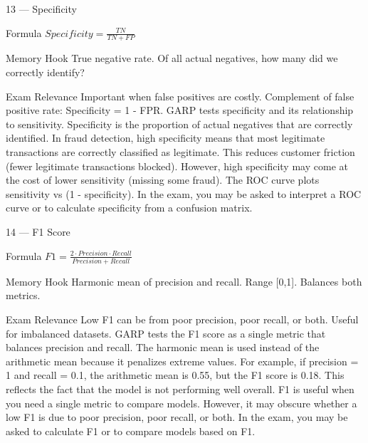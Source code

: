 \documentclass[aspectratio=169,8pt]{beamer}
\begin{document}
	\begin{frame}{13 --- Specificity}
		\begin{block}{Formula}
			$Specificity = \frac{TN}{TN + FP}$
		\end{block}
		\begin{block}{Memory Hook}
			True negative rate. Of all actual negatives, how many did we correctly identify?
		\end{block}
		\begin{block}{Exam Relevance}
			Important when false positives are costly. Complement of false positive rate: Specificity = 1 - FPR. GARP tests specificity and its relationship to sensitivity. Specificity is the proportion of actual negatives that are correctly identified. In fraud detection, high specificity means that most legitimate transactions are correctly classified as legitimate. This reduces customer friction (fewer legitimate transactions blocked). However, high specificity may come at the cost of lower sensitivity (missing some fraud). The ROC curve plots sensitivity vs (1 - specificity). In the exam, you may be asked to interpret a ROC curve or to calculate specificity from a confusion matrix.
		\end{block}
	\end{frame}
	
	\begin{frame}{14 --- F1 Score}
		\begin{block}{Formula}
			$F1 = \frac{2 \cdot Precision \cdot Recall}{Precision + Recall}$
		\end{block}
		\begin{block}{Memory Hook}
			Harmonic mean of precision and recall. Range [0,1]. Balances both metrics.
		\end{block}
		\begin{block}{Exam Relevance}
			Low F1 can be from poor precision, poor recall, or both. Useful for imbalanced datasets. GARP tests the F1 score as a single metric that balances precision and recall. The harmonic mean is used instead of the arithmetic mean because it penalizes extreme values. For example, if precision = 1 and recall = 0.1, the arithmetic mean is 0.55, but the F1 score is 0.18. This reflects the fact that the model is not performing well overall. F1 is useful when you need a single metric to compare models. However, it may obscure whether a low F1 is due to poor precision, poor recall, or both. In the exam, you may be asked to calculate F1 or to compare models based on F1.
		\end{block}
	\end{frame}
	
\end{document}
